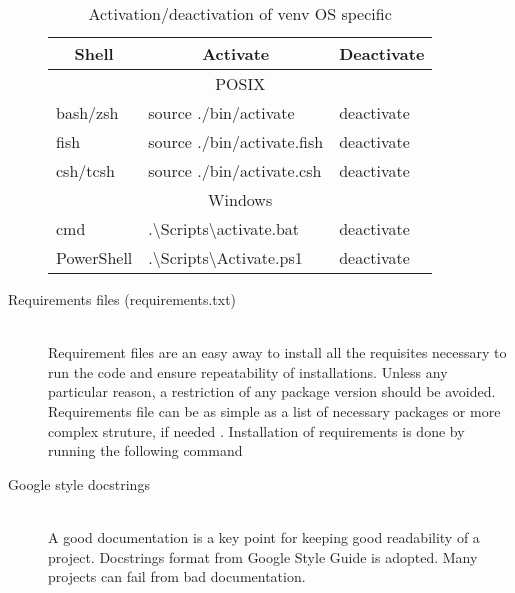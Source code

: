 \begin{description}
	\begin{table}[hb]
		\centering
		\begin{tabular}{lll}
			\toprule
			\multicolumn{1}{c}{\textbf{Shell}} & \multicolumn{1}{c}{\textbf{Activate}} & \multicolumn{1}{c}{\textbf{Deactivate}}\\
			\midrule
			\multicolumn{3}{c}{POSIX}\\
			\midrule
			bash/zsh & source ./bin/activate & deactivate\\
			fish & source ./bin/activate.fish & deactivate\\
			csh/tcsh & source ./bin/activate.csh & deactivate\\
			\midrule
			\multicolumn{3}{c}{Windows}\\
			\midrule
			cmd & .\textbackslash Scripts\textbackslash activate.bat & deactivate\\
			PowerShell & .\textbackslash Scripts\textbackslash Activate.ps1 & deactivate\\
			\bottomrule
		\end{tabular}
		\caption{Activation/deactivation of venv OS specific}
		\label{tab:venv_activate}
	\end{table}
	\item[Requirements files (requirements.txt)] \hfill \\Requirement files are an easy away to install all the requisites necessary to run the code and ensure repeatability of installations. Unless any particular reason, a restriction of any package version should be avoided. Requirements file can be as simple as a list of necessary packages or more complex struture, if needed \cite{python_requirements}. Installation of requirements is done by running the following command 
	\item[Google style docstrings] \hfill \\ A good documentation is a key point for keeping good readability of a project. Docstrings format from Google Style Guide \cite{python_google_style} is adopted. Many projects can fail from bad documentation.

\end{description}
